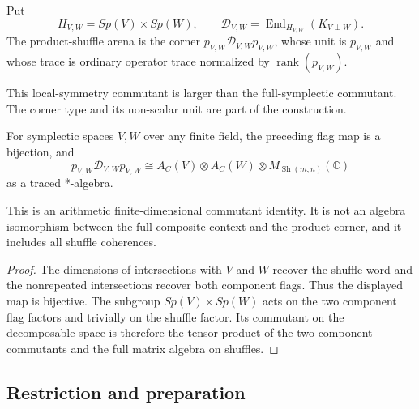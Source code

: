 \begin{definition}
Put
\[
 H_{V,W}=Sp(V)\times Sp(W),\qquad
 \mathcal D_{V,W}=\operatorname{End}_{H_{V,W}}(K_{V\perp W}).
\]
The product-shuffle arena is the corner
$p_{V,W}\mathcal D_{V,W}p_{V,W}$, whose unit is $p_{V,W}$ and whose trace is
ordinary operator trace normalized by $\operatorname{rank}(p_{V,W})$.
\end{definition}
\begin{scope}
This local-symmetry commutant is larger than the full-symplectic commutant.
The corner type and its non-scalar unit are part of the construction.
\end{scope}

\begin{theorem}
{\normalfont\statusProved}\quad
For symplectic spaces $V,W$ over any finite field, the preceding flag map is
a bijection, and
\[
 p_{V,W}\mathcal D_{V,W}p_{V,W}
 \cong A_C(V)\otimes A_C(W)\otimes
       M_{\operatorname{Sh}(m,n)}(\mathbb C)
\]
as a traced *-algebra.
\end{theorem}
\begin{scope}
This is an arithmetic finite-dimensional commutant identity.  It is not an
algebra isomorphism between the full composite context and the product
corner, and it includes all shuffle coherences.
\end{scope}
\begin{proof}
The dimensions of intersections with $V$ and $W$ recover the shuffle word
and the nonrepeated intersections recover both component flags.  Thus the
displayed map is bijective.  The subgroup $Sp(V)\times Sp(W)$ acts on the two
component flag factors and trivially on the shuffle factor.  Its commutant on
the decomposable space is therefore the tensor product of the two component
commutants and the full matrix algebra on shuffles.
\end{proof}

\subsection{Restriction and preparation}

